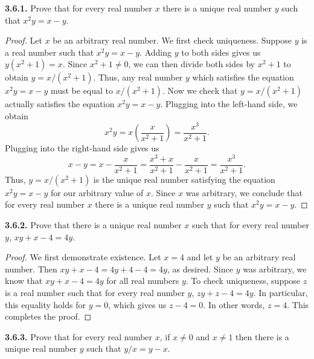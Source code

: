\documentclass[12pt]{amsart}
\newenvironment{statement}[1]{\smallskip\noindent\color[rgb]{.6627, .3529, .6314} {\bf #1.}}{}
\theoremstyle{definition}
\theoremstyle{remark}
\begin{document}
\begin{statement}{3.6.1}
Prove that for every real number $x$ there is a unique real number $y$ such that $x^2y = x - y$.
\end{statement}

\begin{proof}
Let $x$ be an arbitrary real number.
We first check uniqueness.
Suppose $y$ is a real number such that $x^2y = x - y$.
Adding $y$ to both sides gives us $y(x^2 + 1) = x$.
Since $x^2 + 1 \neq 0$, we can then divide both sides by $x^2 + 1$ to obtain $y = x / (x^2 + 1)$.
Thus, any real number $y$ which satisfies the equation $x^2y = x - y$ must be equal to $x / (x^2 + 1)$.
Now we check that $y = x / (x^2 + 1)$ actually satisfies the equation $x^2y = x - y$.
Plugging into the left-hand side, we obtain
\begin{equation*}
	x^2y = x \left( \frac{x}{x^2 + 1} \right) = \frac{x^3}{x^2 + 1}.
\end{equation*}
Plugging into the right-hand side gives us
\begin{equation*}
	x - y = x - \frac{x}{x^2 + 1} = \frac{x^3 + x}{x^2 + 1} - \frac{x}{x^2 + 1} 
	= \frac{x^3}{x^2 + 1}.
\end{equation*}
Thus, $y = x / (x^2 + 1)$ is the unique real number satisfying the equation $x^2y = x - y$ for our arbitrary value of $x$.
Since $x$ was arbitrary, we conclude that for every real number $x$ there is a unique real number $y$ such that $x^2y = x - y$.
\end{proof}


\begin{statement}{3.6.2}
Prove that there is a unique real number $x$ such that for every real number $y$, $xy + x - 4 = 4y$.
\end{statement}

\begin{proof}
We first demonstrate existence.
Let $x = 4$ and let $y$ be an arbitrary real number.
Then $xy + x - 4 = 4y + 4 - 4 = 4y$, as desired.
Since $y$ was arbitrary, we know that $xy + x - 4 = 4y$ for all real numbers $y$.
To check uniqueness, suppose $z$ is a real number such that for every real number $y$, $zy + z  - 4 = 4y$.
In particular, this equality holds for $y = 0$, which gives us $z - 4 = 0$.
In other words, $z = 4$.
This completes the proof.
\end{proof}


\begin{statement}{3.6.3}
Prove that for every real number $x$, if $x \neq 0$ and $x \neq 1$ then there is a unique real number $y$ such that $y/x = y - x$.
\end{statement}
\end{document}
